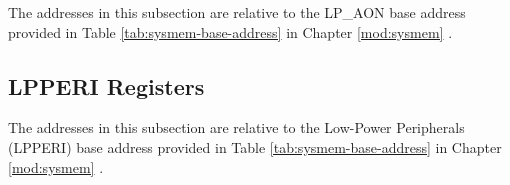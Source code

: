 \documentclass[main\_\_EN.tex]{subfiles}
\begin{document}
The addresses in this subsection are relative to the LP\_AON base address provided in Table \ref{tab:sysmem-base-address} in Chapter \ref{mod:sysmem} \textit{}.


\newpage
\subsection{LPPERI Registers}
\label{sec:sysreg-reg-lpperi}

The addresses in this subsection are relative to the Low-Power Peripherals (LPPERI) base address provided in Table \ref{tab:sysmem-base-address} in Chapter \ref{mod:sysmem} \textit{}.


\end{document}
